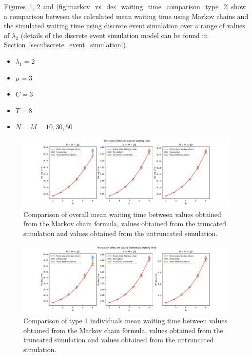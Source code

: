 Figures~\ref{fig:markov_vs_des_waiting_time_comparison_overall},
\ref{fig:markov_vs_des_waiting_time_comparison_type_1}
and~\ref{fig:markov_vs_des_waiting_time_comparison_type_2} show a
comparison between the calculated mean waiting time using Markov chains and the
simulated waiting time using discrete event simulation over a range of values of
\(\lambda_2\) (details of the discrete event simulation model can be found in
Section~\ref{sec:discrete_event_simulation}).

\begin{itemize}
    \item \(\lambda_1 = 2\)
    \item \(\mu = 3\)
    \item \(C = 3\)
    \item \(T = 8\)
    \item \(N = M = 10, 30, 50\)
\end{itemize}

\begin{figure}[H]
    \includegraphics[width=\textwidth]{chapters/03_queueing_model/img/numeric_results_and_timings/truncation_effect/waiting_time_overall.pdf}
    \caption{
        Comparison of overall mean waiting time between values obtained from the
        Markov chain formula, values obtained from the truncated simulation and
        values obtained from the untruncated simulation.
    }
    \label{fig:markov_vs_des_waiting_time_comparison_overall}
\end{figure}

\begin{figure}[H]
    \includegraphics[width=\textwidth]{chapters/03_queueing_model/img/numeric_results_and_timings/truncation_effect/waiting_time_type_1.pdf}
    \caption{
        Comparison of type 1 individuals mean waiting time between values
        obtained from the Markov chain formula, values obtained from the
        truncated simulation and values obtained from the untruncated
        simulation.
    }
    \label{fig:markov_vs_des_waiting_time_comparison_type_1}
\end{figure}

